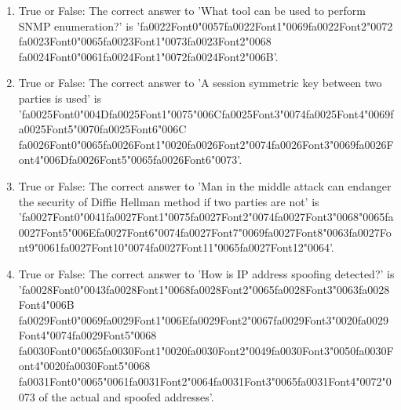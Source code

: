 \documentclass[12pt]{article}
\begin{document}
\begin{enumerate}[label=\arabic*.]
\item True or False: The correct answer to 'What tool can be used to perform SNMP enumeration?' is '{\csname fa0022Font0\endcsname\char"0057}{\csname fa0022Font1\endcsname\char"0069}{\csname fa0022Font2\endcsname\char"0072} {\csname fa0023Font0\endcsname\char"0065}{\csname fa0023Font1\endcsname\char"0073}{\csname fa0023Font2\endcsname\char"0068} {\csname fa0024Font0\endcsname\char"0061}{\csname fa0024Font1\endcsname\char"0072}{\csname fa0024Font2\endcsname\char"006B}'.
\item True or False: The correct answer to 'A session symmetric key between two parties is used' is '{\csname fa0025Font0\endcsname\char"004D}{\csname fa0025Font1\endcsname\char"0075}{\char"006C}{\csname fa0025Font3\endcsname\char"0074}{\csname fa0025Font4\endcsname\char"0069}{\csname fa0025Font5\endcsname\char"0070}{\csname fa0025Font6\endcsname\char"006C} {\csname fa0026Font0\endcsname\char"0065}{\csname fa0026Font1\endcsname\char"0020}{\csname fa0026Font2\endcsname\char"0074}{\csname fa0026Font3\endcsname\char"0069}{\csname fa0026Font4\endcsname\char"006D}{\csname fa0026Font5\endcsname\char"0065}{\csname fa0026Font6\endcsname\char"0073}'.
\item True or False: The correct answer to 'Man in the middle attack can endanger the security of Diffie Hellman method if two parties are not' is '{\csname fa0027Font0\endcsname\char"0041}{\csname fa0027Font1\endcsname\char"0075}{\csname fa0027Font2\endcsname\char"0074}{\csname fa0027Font3\endcsname\char"0068}{\char"0065}{\csname fa0027Font5\endcsname\char"006E}{\csname fa0027Font6\endcsname\char"0074}{\csname fa0027Font7\endcsname\char"0069}{\csname fa0027Font8\endcsname\char"0063}{\csname fa0027Font9\endcsname\char"0061}{\csname fa0027Font10\endcsname\char"0074}{\csname fa0027Font11\endcsname\char"0065}{\csname fa0027Font12\endcsname\char"0064}'.
\item True or False: The correct answer to 'How is IP address spoofing detected?' is '{\csname fa0028Font0\endcsname\char"0043}{\csname fa0028Font1\endcsname\char"0068}{\csname fa0028Font2\endcsname\char"0065}{\csname fa0028Font3\endcsname\char"0063}{\csname fa0028Font4\endcsname\char"006B} {\csname fa0029Font0\endcsname\char"0069}{\csname fa0029Font1\endcsname\char"006E}{\csname fa0029Font2\endcsname\char"0067}{\csname fa0029Font3\endcsname\char"0020}{\csname fa0029Font4\endcsname\char"0074}{\csname fa0029Font5\endcsname\char"0068} {\csname fa0030Font0\endcsname\char"0065}{\csname fa0030Font1\endcsname\char"0020}{\csname fa0030Font2\endcsname\char"0049}{\csname fa0030Font3\endcsname\char"0050}{\csname fa0030Font4\endcsname\char"0020}{\csname fa0030Font5\endcsname\char"0068} {\csname fa0031Font0\endcsname\char"0065}{\char"0061}{\csname fa0031Font2\endcsname\char"0064}{\csname fa0031Font3\endcsname\char"0065}{\csname fa0031Font4\endcsname\char"0072}{\char"0073} of the actual and spoofed addresses'.

\end{enumerate}
\end{document}

